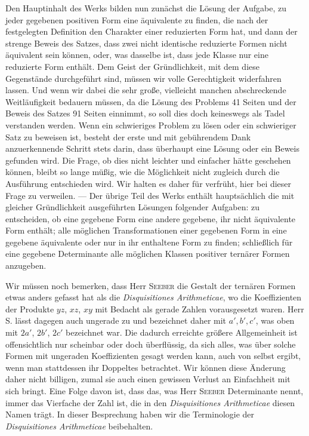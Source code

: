 Den Hauptinhalt des Werks bilden nun zunächst die Lösung der Aufgabe, zu jeder gegebenen positiven Form eine äquivalente zu finden, die nach der festgelegten Definition den Charakter einer reduzierten Form hat, und dann der strenge Beweis des Satzes, dass zwei nicht identische reduzierte Formen nicht äquivalent sein können, oder, was dasselbe ist, dass jede Klasse nur eine reduzierte Form enthält. Dem Geist der Gründlichkeit, mit dem diese Gegenstände durchgeführt sind, müssen wir volle Gerechtigkeit widerfahren lassen. Und wenn wir dabei die sehr große, vielleicht manchen abschreckende Weitläufigkeit bedauern müssen, da die Lösung des Problems 41 Seiten und der Beweis des Satzes 91 Seiten einnimmt, so soll dies doch keineswegs als Tadel verstanden werden. Wenn ein schwieriges Problem zu lösen oder ein schwieriger Satz zu beweisen ist, besteht der erste und mit gebührendem Dank anzuerkennende Schritt stets darin, dass überhaupt eine Lösung oder ein Beweis gefunden wird. Die Frage, ob dies nicht leichter und einfacher hätte geschehen können, bleibt so lange müßig, wie die Möglichkeit nicht zugleich durch die Ausführung entschieden wird. Wir halten es daher für verfrüht, hier bei dieser Frage zu verweilen. --- Der übrige Teil des Werks enthält hauptsächlich die mit gleicher Gründlichkeit ausgeführten Lösungen folgender Aufgaben: zu entscheiden, ob eine gegebene Form eine andere gegebene, ihr nicht äquivalente Form enthält; alle möglichen Transformationen einer gegebenen Form in eine gegebene äquivalente oder nur in ihr enthaltene Form zu finden; schließlich für eine gegebene Determinante alle möglichen Klassen positiver ternärer Formen anzugeben.

Wir müssen noch bemerken, dass Herr \textsc{Seeber} die Gestalt der ternären Formen etwas anders gefasst hat als die \emph{Disquisitiones Arithmeticae}, wo die Koeffizienten der Produkte $yz$, $xz$, $xy$ mit Bedacht als gerade Zahlen vorausgesetzt waren. Herr S. lässt dagegen auch ungerade zu und bezeichnet daher
mit $a',b',c'$, was oben mit $2a'$, $2b'$, $2c'$ bezeichnet war. Die dadurch erreichte größere Allgemeinheit ist offensichtlich nur scheinbar oder doch überflüssig, da sich alles, was über solche Formen mit ungeraden Koeffizienten gesagt werden kann, auch von selbst ergibt, wenn man stattdessen ihr Doppeltes betrachtet. Wir können diese Änderung daher nicht billigen, zumal sie auch einen gewissen Verlust an Einfachheit mit sich bringt. Eine Folge davon ist, dass das, was Herr \textsc{Seeber} Determinante nennt, immer das Vierfache der Zahl ist, die in den \emph{Disquisitiones Arithmeticae} diesen Namen trägt. In dieser Besprechung haben wir die Terminologie der \emph{Disquisitiones Arithmeticae} beibehalten.

